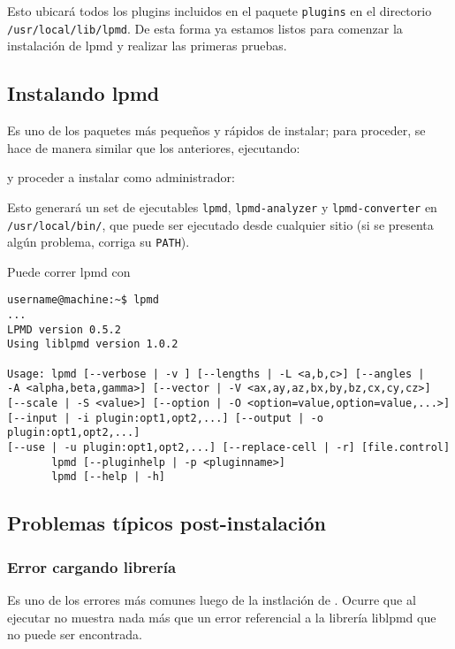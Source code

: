 Esto ubicar\'a todos los plugins incluidos en el paquete \verb|plugins| en el directorio \verb|/usr/local/lib/lpmd|. De esta forma ya estamos listos para comenzar la instalaci\'on de lpmd y realizar las primeras pruebas.

\subsection{Instalando lpmd}

Es uno de los paquetes m\'as peque\~nos y r\'apidos de instalar; para proceder, se hace de manera similar que los anteriores, ejecutando:


y proceder a instalar como administrador:


Esto generar\'a un set de ejecutables \verb|lpmd|, \verb|lpmd-analyzer| y \verb|lpmd-converter| en \verb|/usr/local/bin/|, que puede ser ejecutado desde cualquier sitio (si se presenta alg\'un problema, corriga su \verb|PATH|).

Puede correr lpmd con

\begin{verbatim}
username@machine:~$ lpmd
...
LPMD version 0.5.2
Using liblpmd version 1.0.2

Usage: lpmd [--verbose | -v ] [--lengths | -L <a,b,c>] [--angles | 
-A <alpha,beta,gamma>] [--vector | -V <ax,ay,az,bx,by,bz,cx,cy,cz>] 
[--scale | -S <value>] [--option | -O <option=value,option=value,...>] 
[--input | -i plugin:opt1,opt2,...] [--output | -o plugin:opt1,opt2,...] 
[--use | -u plugin:opt1,opt2,...] [--replace-cell | -r] [file.control]
       lpmd [--pluginhelp | -p <pluginname>]
       lpmd [--help | -h]
\end{verbatim}

\subsection{Problemas t\'ipicos post-instalaci\'on}

\subsubsection{Error cargando librer\'ia}

Es uno de los errores m\'as comunes luego de la instlaci\'on de {\lpmd}. Ocurre que al ejecutar {\lpmd} no muestra nada m\'as que un error referencial a la librer\'ia liblpmd que no puede ser encontrada.

